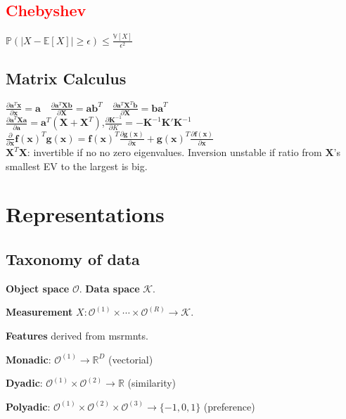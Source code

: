 \subsection*{\textcolor{red}{Chebyshev}}
$\mathbb{P}(|X-\mathbb{E}[X]|\geq \epsilon)\leq \frac{\mathbb{V}[X]}{\epsilon^2}$\\

\subsection*{Matrix Calculus}
$\frac{\partial \mathbf{a}^T\mathbf{x}}{\partial\mathbf{x}}{=}\mathbf{a} \quad \frac{\partial \mathbf{a}^T\mathbf{Xb}}{\partial\mathbf{X}}{=}\mathbf{ab}^T \quad \frac{\partial \mathbf{a}^T\mathbf{X}^T\mathbf{b}}{\partial\mathbf{X}}{=}\mathbf{ba}^T $\\
$\frac{\partial \mathbf{a}^T\mathbf{Xa}}{\partial\mathbf{a}}{=}\mathbf{a}^T(\mathbf{X}+\mathbf{X}^T)$,$\frac{\partial \mathbf{K}^{-1}}{\partial K}=-\mathbf{K}^{-1}\mathbf{K}'\mathbf{K}^{-1}$\\
 $\frac{\partial}{\partial\mathbf{x}} \mathbf{f(x)}^T\mathbf{g(x)}{=}\mathbf{f(x)}^T\frac{\partial \mathbf{g(x)}}{\partial\mathbf{x}}+\mathbf{g(x)}^T\frac{\partial\mathbf{f(x)}}{\partial\mathbf{x}}$\\
$\mathbf{X}^T\mathbf{X}$: invertible if no no zero eigenvalues.
Inversion unstable if ratio from $\mathbf{X}$'s smallest EV to the largest is big.

\section*{Representations}
\subsection*{Taxonomy of data}
\textbf{Object space} $\mathcal{O}$. \textbf{Data space} $\mathcal{K}$.

\textbf{Measurement} $X:\mathcal{O}^{(1)}\times\cdots\times\mathcal{O}^{(R)} \rightarrow \mathcal{K}$.

\textbf{Features} derived from msrmnts.

\textbf{Monadic}: $\mathcal{O}^{(1)} \rightarrow \mathbb{R}^D$ (vectorial)

\textbf{Dyadic}: $\mathcal{O}^{(1)}\times\mathcal{O}^{(2)} \rightarrow \mathbb{R}$ (similarity)

\textbf{Polyadic}: $\mathcal{O}^{(1)}\times\mathcal{O}^{(2)}\times\mathcal{O}^{(3)} \rightarrow \{-1, 0, 1\}$ (preference)

